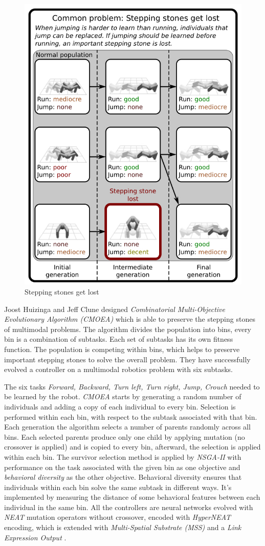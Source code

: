 \documentclass[format=acmsmall, review=false, screen=true]{acmart}
\begin{document}
\begin{figure}[H]
  \includegraphics[width=0.46\linewidth]{img/jumping_running.JPEG}
  \caption{\label{fig:jumping_running}Stepping stones get lost}
\end{figure}

Joost Huizinga and Jeff Clune designed \emph{Combinatorial Multi-Objective Evolutionary Algorithm (CMOEA)} which is able to preserve the stepping stones of multimodal problems. The algorithm divides the population into bins, every bin is a combination of subtasks. Each set of subtasks has its own fitness function. The population is competing within bins, which helps to preserve important stepping stones to solve the overall problem. They have successfully evolved a controller on a multimodal robotics problem with six subtasks.

The six tasks \emph{Forward, Backward, Turn left, Turn right, Jump, Crouch} needed to be learned by the robot. \emph{CMOEA} starts by generating a random number of individuals and adding a copy of each individual to every bin. Selection is performed within each bin, with respect to the subtask associated with that bin. Each generation the algorithm selects a number of parents randomly across all bins. Each selected parents produce only one child by applying mutation (no crossover is applied) and is copied to every bin, afterward, the selection is applied within each bin. The survivor selection method is applied by \emph{NSGA-II} with performance on the task associated with the given bin as one objective and \emph{behavioral diversity} \cite{behavioraldiversity} as the other objective. Behavioral diversity ensures that individuals within each bin solve the same subtask in different ways. It's implemented by measuring the distance of some behavioral features between each individual in the same bin. All the controllers are neural networks evolved with \emph{NEAT} mutation operators without crossover, encoded with \emph{HyperNEAT} \cite{hyperneat} encoding, which is extended with \emph{Multi-Spatial Substrate (MSS)} \cite{pugh2013evolving} and a \emph{Link Expression Output} \cite{stanley2011constraining}.
\end{document}
